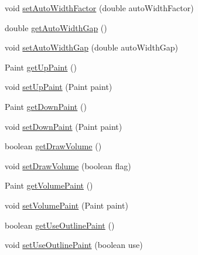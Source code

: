 \begin{DoxyCompactItemize}
void \mbox{\hyperlink{classorg_1_1jfree_1_1chart_1_1renderer_1_1xy_1_1_candlestick_renderer_a0189cacb382b9e002ad932e555a79664}{set\+Auto\+Width\+Factor}} (double auto\+Width\+Factor)
\item 
double \mbox{\hyperlink{classorg_1_1jfree_1_1chart_1_1renderer_1_1xy_1_1_candlestick_renderer_a43a56602a325bb287cce2fa5bb40c1a1}{get\+Auto\+Width\+Gap}} ()
\item 
void \mbox{\hyperlink{classorg_1_1jfree_1_1chart_1_1renderer_1_1xy_1_1_candlestick_renderer_ae86e0bc0453129bf8579ae7a5d2ee821}{set\+Auto\+Width\+Gap}} (double auto\+Width\+Gap)
\item 
Paint \mbox{\hyperlink{classorg_1_1jfree_1_1chart_1_1renderer_1_1xy_1_1_candlestick_renderer_a14f115bf4294f88845d318372e703d0f}{get\+Up\+Paint}} ()
\item 
void \mbox{\hyperlink{classorg_1_1jfree_1_1chart_1_1renderer_1_1xy_1_1_candlestick_renderer_aecca1e61a2e3d8ed2532c05de9c2bd39}{set\+Up\+Paint}} (Paint paint)
\item 
Paint \mbox{\hyperlink{classorg_1_1jfree_1_1chart_1_1renderer_1_1xy_1_1_candlestick_renderer_a31e9899cbfb21afd7c8277102e681f6f}{get\+Down\+Paint}} ()
\item 
void \mbox{\hyperlink{classorg_1_1jfree_1_1chart_1_1renderer_1_1xy_1_1_candlestick_renderer_a4f4d646b118cd0fd8cb206e0d405add5}{set\+Down\+Paint}} (Paint paint)
\item 
boolean \mbox{\hyperlink{classorg_1_1jfree_1_1chart_1_1renderer_1_1xy_1_1_candlestick_renderer_a031b1f856f7ef71b3ec51e52604c9dfe}{get\+Draw\+Volume}} ()
\item 
void \mbox{\hyperlink{classorg_1_1jfree_1_1chart_1_1renderer_1_1xy_1_1_candlestick_renderer_ae3b4de230818ae0c8278052b9a1722f3}{set\+Draw\+Volume}} (boolean flag)
\item 
Paint \mbox{\hyperlink{classorg_1_1jfree_1_1chart_1_1renderer_1_1xy_1_1_candlestick_renderer_aceacdf4786ea906e937154c46474e117}{get\+Volume\+Paint}} ()
\item 
void \mbox{\hyperlink{classorg_1_1jfree_1_1chart_1_1renderer_1_1xy_1_1_candlestick_renderer_ae38a9367abdb25199c31357fe5a43f9d}{set\+Volume\+Paint}} (Paint paint)
\item 
boolean \mbox{\hyperlink{classorg_1_1jfree_1_1chart_1_1renderer_1_1xy_1_1_candlestick_renderer_af07ad55de5bec4a88d556fa1a76f34fd}{get\+Use\+Outline\+Paint}} ()
\item 
void \mbox{\hyperlink{classorg_1_1jfree_1_1chart_1_1renderer_1_1xy_1_1_candlestick_renderer_a36ef8d46b1f8ff99c0a1172e69e591c0}{set\+Use\+Outline\+Paint}} (boolean use)

\end{DoxyCompactItemize}
